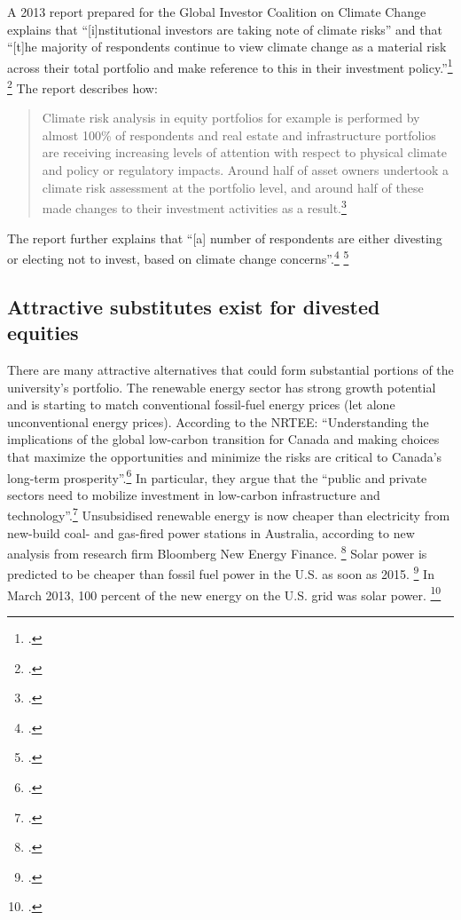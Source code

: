 \documentclass[10pt]{article}
\begin{document}
A 2013 report prepared for the Global Investor Coalition on Climate Change explains that ``[i]nstitutional investors are taking note of climate risks'' and that ``[t]he majority of respondents continue to view climate change as a material risk across their total portfolio and make reference to this in their investment policy.''\footcite[][p. 5, 7]{GICOCC2013} \footcite[See also: ][]{Yeo2013}
The report describes how:
\begin{quote}
Climate risk analysis in equity portfolios for example is performed by almost 100\% of respondents and real estate and infrastructure portfolios are receiving increasing levels of attention with respect to physical climate and policy or regulatory impacts. Around half of asset owners undertook a climate risk assessment at the portfolio level, and around half of these made changes to their investment activities as a result.\footcite[][p. 6]{GICOCC2013}
\end{quote}
The report further explains that ``[a] number of respondents are either divesting or electing not to invest, based on climate change concerns''.\footcite[][p. 6]{GICOCC2013} \footcite[See also: ][]{Vittorio2013}



	\subsection {Attractive substitutes exist for divested equities}



There are many attractive alternatives that could form substantial portions of the university's portfolio.
The renewable energy sector has strong growth potential and is starting to match conventional fossil-fuel energy prices (let alone unconventional energy prices).
According to the NRTEE: ``Understanding the implications of the global low-carbon transition for Canada and making choices that maximize the opportunities and minimize the risks are critical to Canada's long-term prosperity''.\footcite[][p. 15]{FramingFuture}
In particular, they argue that the ``public and private sectors need to mobilize investment in low-carbon infrastructure and technology''.\footcite[][p. 17]{FramingFuture}
Unsubsidised renewable energy is now cheaper than electricity from new-build coal- and gas-fired power stations in Australia, according to new analysis from research firm Bloomberg New Energy Finance. \footcite{BlombergAussieWind}
Solar power is predicted to be cheaper than fossil fuel power in the U.S. as soon as 2015. \footcite{GlobalDataSolar}
In March 2013, 100 percent of the new energy on the U.S. grid was solar power. \footcite{SmartPlanetSolar100}
\end{document}

